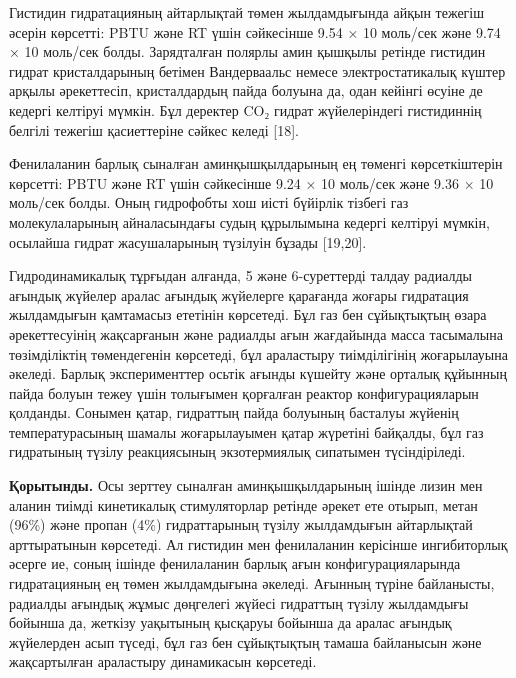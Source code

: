 

\begin{multicols}{2}
Гистидин гидратацияның айтарлықтай төмен жылдамдығында айқын тежегіш
әсерін көрсетті: PBTU және RT үшін сәйкесінше 9.54 ×
10 моль/сек және 9.74 × 10
моль/сек болды. Зарядталған полярлы амин қышқылы ретінде гистидин гидрат
кристалдарының бетімен Вандерваальс немесе электростатикалық күштер
арқылы әрекеттесіп, кристалдардың пайда болуына да, одан кейінгі өсуіне
де кедергі келтіруі мүмкін. Бұл деректер CO₂ гидрат жүйелеріндегі
гистидиннің белгілі тежегіш қасиеттеріне сәйкес келеді {[}18{]}.

Фенилаланин барлық сыналған аминқышқылдарының ең төменгі көрсеткіштерін
көрсетті: PBTU және RT үшін сәйкесінше 9.24 × 10
моль/сек және 9.36 × 10 моль/сек болды. Оның
гидрофобты хош иісті бүйірлік тізбегі газ молекулаларының айналасындағы
судың құрылымына кедергі келтіруі мүмкін, осылайша гидрат жасушаларының
түзілуін бұзады {[}19,20{]}.

Гидродинамикалық тұрғыдан алғанда, 5 және 6-суреттерді талдау радиалды
ағындық жүйелер аралас ағындық жүйелерге қарағанда жоғары гидратация
жылдамдығын қамтамасыз ететінін көрсетеді. Бұл газ бен сұйықтықтың өзара
әрекеттесуінің жақсарғанын және радиалды ағын жағдайында масса
тасымалына төзімділіктің төмендегенін көрсетеді, бұл араластыру
тиімділігінің жоғарылауына әкеледі. Барлық эксперименттер осьтік ағынды
күшейту және орталық құйынның пайда болуын тежеу үшін толығымен
қорғалған реактор конфигурацияларын қолданды. Сонымен қатар, гидраттың
пайда болуының басталуы жүйенің температурасының шамалы жоғарылауымен
қатар жүретіні байқалды, бұл газ гидратының түзілу реакциясының
экзотермиялық сипатымен түсіндіріледі.

{\bfseries Қорытынды.} Осы зерттеу сыналған аминқышқылдарының ішінде лизин
мен аланин тиімді кинетикалық стимуляторлар ретінде әрекет ете отырып,
метан (96\%) және пропан (4\%) гидраттарының түзілу жылдамдығын
айтарлықтай арттыратынын көрсетеді. Ал гистидин мен фенилаланин
керісінше ингибиторлық әсерге ие, соның ішінде фенилаланин барлық ағын
конфигурацияларында гидратацияның ең төмен жылдамдығына әкеледі. Ағынның
түріне байланысты, радиалды ағындық жұмыс дөңгелегі жүйесі гидраттың
түзілу жылдамдығы бойынша да, жеткізу уақытының қысқаруы бойынша да
аралас ағындық жүйелерден асып түседі, бұл газ бен сұйықтықтың тамаша
байланысын және жақсартылған араластыру динамикасын көрсетеді.


\end{multicols}
